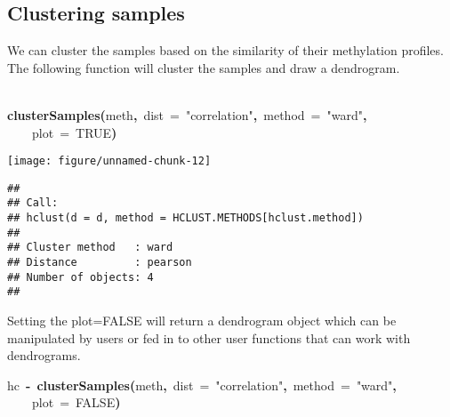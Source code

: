 \documentclass{article}
\makeatletter
\newcommand{\hlnumber}[1]{\textcolor[rgb]{0,0,0}{#1}}%
\newcommand{\hlfunctioncall}[1]{\textcolor[rgb]{.5,0,.33}{\textbf{#1}}}%
\newcommand{\hlstring}[1]{\textcolor[rgb]{.6,.6,1}{#1}}%
\newcommand{\hlkeyword}[1]{\textbf{#1}}%
\newcommand{\hlargument}[1]{\textcolor[rgb]{.69,.25,.02}{#1}}%
\newcommand{\hlassignement}[1]{\textbf{#1}}%
\newcommand{\hlsymbol}[1]{#1}%
\newcommand{\hlstd}[1]{\textcolor[rgb]{0,0,0}{#1}}%
\newenvironment{kframe}{%
 \def\FrameCommand##1{\hskip\@totalleftmargin \hskip-\fboxsep
 \colorbox{shadecolor}{##1}\hskip-\fboxsep
     \hskip-\linewidth \hskip-\@totalleftmargin \hskip\columnwidth}%
 \MakeFramed {\advance\hsize-\width
   \@totalleftmargin\z@ \linewidth\hsize
   \@setminipage}}%
 {\par\unskip\endMakeFramed}
\newenvironment{knitrout}{}{} %
\makeatother
\begin{document}
\subsection{Clustering samples}
We can cluster the samples based on the similarity of their methylation profiles. The following function will cluster the samples and draw a dendrogram.
\begin{center}
\begin{knitrout}
\color{fgcolor}\begin{kframe}
\begin{flushleft}
\ttfamily\noindent
\hspace*{\fill}\\
\hlstd{}\hlfunctioncall{clusterSamples}\hlkeyword{(}\hlsymbol{meth}\hlkeyword{,}{\ }\hlargument{dist}{\ }\hlargument{=}{\ }\hlstring{"{}correlation"{}}\hlkeyword{,}{\ }\hlargument{method}{\ }\hlargument{=}{\ }\hlstring{"{}ward"{}}\hlkeyword{,}\hspace*{\fill}\\
\hlstd{}{\ }{\ }{\ }{\ }\hlargument{plot}{\ }\hlargument{=}{\ }\hlnumber{TRUE}\hlkeyword{)}\mbox{}
\normalfont
\end{flushleft}
\end{kframe}

{\centering \texttt{[image: figure/unnamed-chunk-12]} 

}

\begin{kframe}\begin{verbatim}
## 
## Call:
## hclust(d = d, method = HCLUST.METHODS[hclust.method])
## 
## Cluster method   : ward 
## Distance         : pearson 
## Number of objects: 4 
## 
\end{verbatim}
\end{kframe}
\end{knitrout}

\end{center}

Setting the plot=FALSE will return a dendrogram object which can be manipulated by users or fed in to other user functions that can work with dendrograms.
\begin{knitrout}
\color{fgcolor}\begin{kframe}
\begin{flushleft}
\ttfamily\noindent
\hlsymbol{hc}{\ }\hlassignement{\usebox{\hlnormalsizeboxlessthan}-}{\ }\hlfunctioncall{clusterSamples}\hlkeyword{(}\hlsymbol{meth}\hlkeyword{,}{\ }\hlargument{dist}{\ }\hlargument{=}{\ }\hlstring{"{}correlation"{}}\hlkeyword{,}{\ }\hlargument{method}{\ }\hlargument{=}{\ }\hlstring{"{}ward"{}}\hlkeyword{,}\hspace*{\fill}\\
\hlstd{}{\ }{\ }{\ }{\ }\hlargument{plot}{\ }\hlargument{=}{\ }\hlnumber{FALSE}\hlkeyword{)}\mbox{}
\normalfont
\end{flushleft}
\end{kframe}
\end{knitrout}
\end{document}
